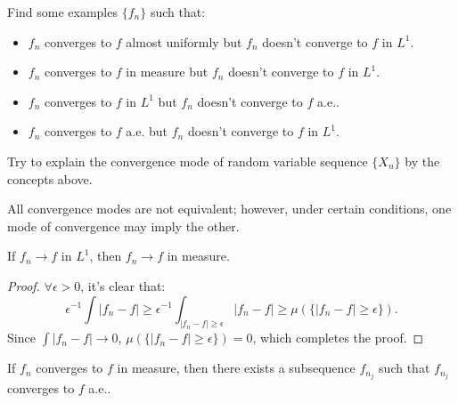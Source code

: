 \begin{exc}
    Find some examples $\{f_{n}\}$ such that: 
    \begin{itemize}
        \item $f_{n}$ converges to $f$ 
        almost uniformly but $f_{n}$ doesn't converge 
        to $f$ in $L^{1}$. 
        \item $f_{n}$ converges to $f$ in measure but 
        $f_{n}$ doesn't converge to $f$ in $L^{1}$.
        \item $f_{n}$ converges to $f$ in $L^{1}$ but 
        $f_{n}$ doesn't converge to $f$ a.e..
        \item $f_{n}$ converges to $f$ a.e. but 
        $f_{n}$ doesn't converge to $f$ in $L^{1}$.
    \end{itemize} 
\end{exc}
\begin{exc}
    Try to explain the convergence mode of random variable 
    sequence $\{X_{n}\}$ by the concepts above.
\end{exc}
\begin{rem}
    All convergence modes are not equivalent; 
    however, under certain conditions, 
    one mode of convergence may imply the other.
\end{rem}
\begin{prop}
    \label{Prop:L1convergeImplyConvergeinmeas}
    If $f_{n}\rightarrow f$ in $L^{1}$, then $f_{n}\rightarrow f$ 
    in measure.
\end{prop}
\begin{proof}
    $\forall\epsilon>0$, it's clear that:
    \begin{displaymath}
        \epsilon^{-1}\int|f_n-f|\ge\epsilon^{-1}
        \int_{|f_n-f|\ge\epsilon}|f_{n}-f|
        \ge\mu(\{|f_n-f|\ge\epsilon\}).
    \end{displaymath}
    Since $\int|f_{n}-f|\rightarrow 0$, 
    $\mu(\{|f_n-f|\ge\epsilon\})=0$, 
    which completes the proof.
\end{proof}
\begin{thm}[Riesz]
    \label{Thm:Riesz}
    If $f_{n}$ converges to $f$ in measure, then 
    there exists a subsequence $f_{n_j}$ such that $f_{n_j}$ 
    converges to $f$ a.e..
\end{thm}
